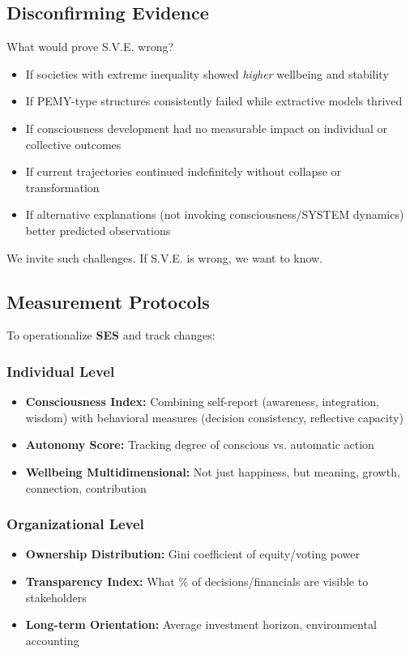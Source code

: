 \documentclass[11pt,a4paper]{article}
\newcommand{\SES}{\textbf{SES}}
\theoremstyle{definition}
\theoremstyle{remark}
\begin{document}
\subsection{Disconfirming Evidence}

What would prove S.V.E. wrong?

\begin{itemize}
    \item If societies with extreme inequality showed \textit{higher} wellbeing and stability
    \item If PEMY-type structures consistently failed while extractive models thrived
    \item If consciousness development had no measurable impact on individual or collective outcomes
    \item If current trajectories continued indefinitely without collapse or transformation
    \item If alternative explanations (not invoking consciousness/SYSTEM dynamics) better predicted observations
\end{itemize}

We invite such challenges. If S.V.E. is wrong, we want to know.

\subsection{Measurement Protocols}

To operationalize \SES{} and track changes:

\subsubsection{Individual Level}
\begin{itemize}
    \item \textbf{Consciousness Index:} Combining self-report (awareness, integration, wisdom) with behavioral measures (decision consistency, reflective capacity)
    \item \textbf{Autonomy Score:} Tracking degree of conscious vs. automatic action
    \item \textbf{Wellbeing Multidimensional:} Not just happiness, but meaning, growth, connection, contribution
\end{itemize}

\subsubsection{Organizational Level}
\begin{itemize}
    \item \textbf{Ownership Distribution:} Gini coefficient of equity/voting power
    \item \textbf{Transparency Index:} What \% of decisions/financials are visible to stakeholders
    \item \textbf{Long-term Orientation:} Average investment horizon, environmental accounting
\end{itemize}
\end{document}
